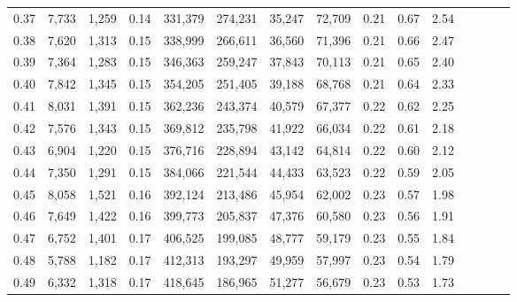 \begin{tabular}{rrrcrrrrrrrrrrr}
0.37 &   7,733 &   1,259 &                                       0.14 &  331,379 &  274,231 &   35,247 &   72,709 &  0.21 &  0.67 &                         2.54 \\
0.38 &   7,620 &   1,313 &                                       0.15 &  338,999 &  266,611 &   36,560 &   71,396 &  0.21 &  0.66 &                         2.47 \\
0.39 &   7,364 &   1,283 &                                       0.15 &  346,363 &  259,247 &   37,843 &   70,113 &  0.21 &  0.65 &                         2.40 \\
0.40 &   7,842 &   1,345 &                                       0.15 &  354,205 &  251,405 &   39,188 &   68,768 &  0.21 &  0.64 &                         2.33 \\
0.41 &   8,031 &   1,391 &                                       0.15 &  362,236 &  243,374 &   40,579 &   67,377 &  0.22 &  0.62 &                         2.25 \\
0.42 &   7,576 &   1,343 &                                       0.15 &  369,812 &  235,798 &   41,922 &   66,034 &  0.22 &  0.61 &                         2.18 \\
0.43 &   6,904 &   1,220 &                                       0.15 &  376,716 &  228,894 &   43,142 &   64,814 &  0.22 &  0.60 &                         2.12 \\
0.44 &   7,350 &   1,291 &                                       0.15 &  384,066 &  221,544 &   44,433 &   63,523 &  0.22 &  0.59 &                         2.05 \\
0.45 &   8,058 &   1,521 &                                       0.16 &  392,124 &  213,486 &   45,954 &   62,002 &  0.23 &  0.57 &                         1.98 \\
0.46 &   7,649 &   1,422 &                                       0.16 &  399,773 &  205,837 &   47,376 &   60,580 &  0.23 &  0.56 &                         1.91 \\
0.47 &   6,752 &   1,401 &                                       0.17 &  406,525 &  199,085 &   48,777 &   59,179 &  0.23 &  0.55 &                         1.84 \\
0.48 &   5,788 &   1,182 &                                       0.17 &  412,313 &  193,297 &   49,959 &   57,997 &  0.23 &  0.54 &                         1.79 \\
0.49 &   6,332 &   1,318 &                                       0.17 &  418,645 &  186,965 &   51,277 &   56,679 &  0.23 &  0.53 &                         1.73 \\

\end{tabular}
